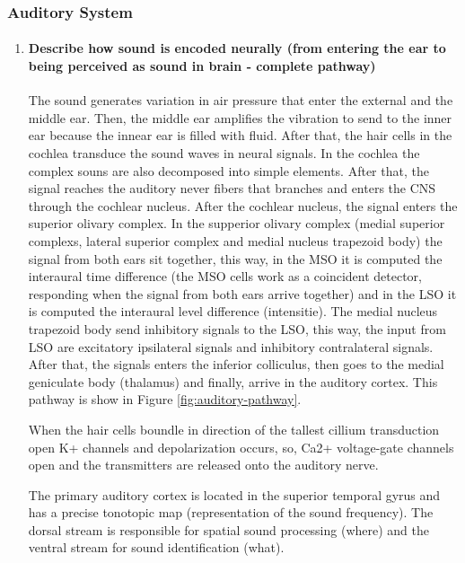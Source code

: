\documentclass[12pt,article,oneside,a4paper]{memoir}
\begin{document}
\subsubsection{Auditory System}
\begin{enumerate}
\item \paragraph{Describe how sound is encoded neurally (from entering the ear to being perceived as sound in brain - complete pathway)}\label{question:auditory-pathway}

The sound generates variation in air pressure that enter the external and the middle ear. Then, the middle ear amplifies the vibration to send to the inner ear because the innear ear is filled with fluid. After that, the hair cells in the cochlea transduce the sound waves in neural signals. In the cochlea the complex souns are also decomposed into simple elements. After that, the signal reaches the auditory never fibers that branches and enters the CNS through the cochlear nucleus. After the cochlear nucleus, the signal enters the superior olivary complex. In the supperior olivary complex (medial superior complexs, lateral superior complex and medial nucleus trapezoid body) the signal from both ears sit together, this way, in the MSO it is computed the interaural time difference (the MSO cells work as a coincident detector, responding when the signal from both ears arrive together) and in the LSO it is computed the interaural level difference (intensitie). The medial nucleus trapezoid body send inhibitory signals to the LSO, this way, the input from LSO are excitatory ipsilateral signals and inhibitory contralateral signals. After that, the signals enters the inferior colliculus, then goes to the medial geniculate body (thalamus) and finally, arrive in the auditory cortex. This pathway is show in Figure \ref{fig:auditory-pathway}.

When the hair cells boundle in direction of the tallest cillium transduction open K+ channels and depolarization occurs, so, Ca2+ voltage-gate channels open and the transmitters are released onto the auditory nerve.

The primary auditory cortex is located in the superior temporal gyrus and has a precise tonotopic map (representation of the sound frequency). The dorsal stream is responsible for spatial sound processing (where) and the ventral stream for sound identification (what).


\end{enumerate}
\end{document}
